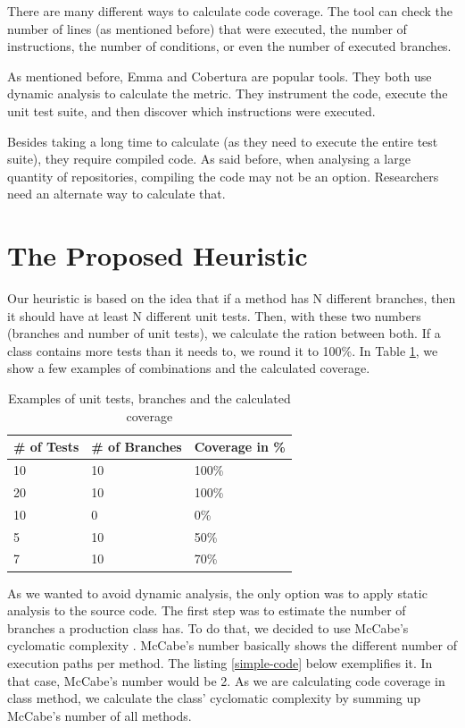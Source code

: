 \documentclass{sig-alternate}
\begin{document}
There are many different ways to calculate code coverage. The tool can check the number
of lines (as mentioned before) that were executed, the number of instructions, the number of conditions, 
or even the number of executed branches.

As mentioned before, Emma and Cobertura are popular tools. 
They both use dynamic analysis to calculate the metric. They instrument the code, 
execute the unit test suite, and then discover which instructions were executed.

Besides taking a long time to calculate (as they need to execute the entire test suite),
they require compiled code. As said before, when analysing a large quantity of repositories,
compiling the code may not be an option. Researchers need an alternate way to calculate that.

\section{The Proposed Heuristic}
\label{sec-heuristic}

Our heuristic is based on the idea that if a method has N different branches, then it should
have at least N different unit tests. Then, with these two numbers (branches and number of unit tests),
we calculate the ration between both. If a class contains more tests than it needs to, we round it
to 100\%.
In Table \ref{tab:ratio}, we show a few examples of combinations
and the calculated coverage. 

\begin{table}[h!]
\centering
\caption{Examples of unit tests, branches and the calculated coverage}
\begin{tabular}{ | l | l | l |}
\hline
\# of Tests & \# of Branches & Coverage in \% \\ 
\hline
10 & 10 & 100\% \\
20 & 10 & 100\% \\
10 & 0 & 0\% \\
5 & 10 & 50\% \\
7 & 10 & 70\% \\

\hline
\end{tabular}
\label{tab:ratio}
\end{table}

As we wanted to avoid dynamic analysis, the only option was to apply static analysis to
the source code. 
The first step was to estimate the number of branches a production class has. 
To do that, we decided to use McCabe's cyclomatic complexity \cite{mccabe}.
McCabe's number basically shows the different number of execution paths per method. The listing
\ref{simple-code} below exemplifies it. In that case, McCabe's number would be 2.
As we are calculating code coverage in class method, we calculate the class' cyclomatic complexity
by summing up McCabe's number of all methods.
\end{document}
